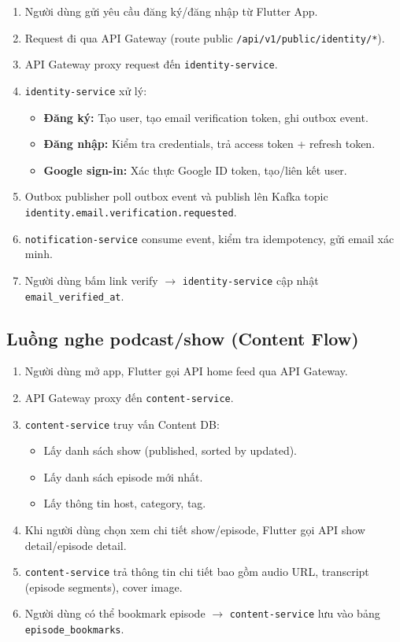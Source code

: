 \documentclass[14pt,a4paper,oneside]{extreport}
\begin{document}
\begin{enumerate}[leftmargin=2cm]
  \item Người dùng gửi yêu cầu đăng ký/đăng nhập từ Flutter App.
  \item Request đi qua API Gateway (route public \texttt{/api/v1/public/identity/*}).
  \item API Gateway proxy request đến \texttt{identity-service}.
  \item \texttt{identity-service} xử lý:
    \begin{itemize}
      \item \textbf{Đăng ký:} Tạo user, tạo email verification token, ghi outbox event.
      \item \textbf{Đăng nhập:} Kiểm tra credentials, trả access token + refresh token.
      \item \textbf{Google sign-in:} Xác thực Google ID token, tạo/liên kết user.
    \end{itemize}
  \item Outbox publisher poll outbox event và publish lên Kafka topic \texttt{identity.email.verification.requested}.
  \item \texttt{notification-service} consume event, kiểm tra idempotency, gửi email xác minh.
  \item Người dùng bấm link verify $\rightarrow$ \texttt{identity-service} cập nhật \texttt{email\_verified\_at}.
\end{enumerate}

\subsection{Luồng nghe podcast/show (Content Flow)}

\begin{enumerate}[leftmargin=2cm]
  \item Người dùng mở app, Flutter gọi API home feed qua API Gateway.
  \item API Gateway proxy đến \texttt{content-service}.
  \item \texttt{content-service} truy vấn Content DB:
    \begin{itemize}
      \item Lấy danh sách show (published, sorted by updated).
      \item Lấy danh sách episode mới nhất.
      \item Lấy thông tin host, category, tag.
    \end{itemize}
  \item Khi người dùng chọn xem chi tiết show/episode, Flutter gọi API show detail/episode detail.
  \item \texttt{content-service} trả thông tin chi tiết bao gồm audio URL, transcript (episode segments), cover image.
  \item Người dùng có thể bookmark episode $\rightarrow$ \texttt{content-service} lưu vào bảng \texttt{episode\_bookmarks}.
\end{enumerate}
\end{document}
